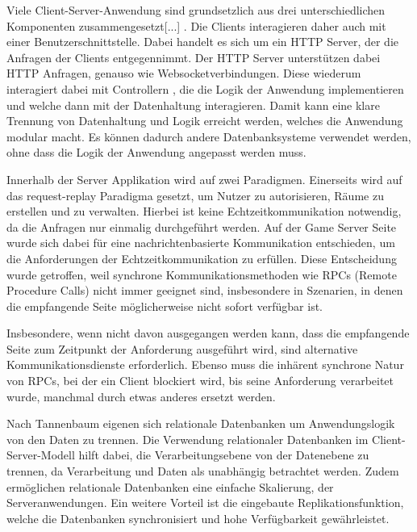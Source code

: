 \documentclass[
]{article}
\begin{document}
\glqq Viele Client-Server-Anwendung sind grundsetzlich aus drei unterschiedlichen Komponenten zusammengesetzt[...]\grqq{} \cite[S.57 ff.]{tanenbaum2007distributed}.
Die Clients interagieren daher auch mit einer Benutzerschnittstelle. Dabei handelt es sich um ein HTTP Server, der die Anfragen der Clients entgegennimmt.
Der HTTP Server unterstützen dabei HTTP Anfragen, genauso wie Websocketverbindungen.
Diese wiederum interagiert dabei mit \glqq Controllern \grqq{}, die die Logik der Anwendung implementieren und welche dann
mit der Datenhaltung interagieren. Damit kann eine klare Trennung von Datenhaltung und Logik erreicht werden, welches die Anwendung
modular macht. Es können dadurch andere Datenbanksysteme verwendet werden, ohne dass die Logik der Anwendung angepasst werden muss.

Innerhalb der Server Applikation wird auf zwei Paradigmen.
Einerseits wird auf das request-replay Paradigma gesetzt, um Nutzer zu autorisieren, Räume zu erstellen und zu verwalten.
Hierbei ist keine Echtzeitkommunikation notwendig, da die Anfragen nur einmalig durchgeführt werden.
Auf der Game Server Seite wurde sich dabei für eine nachrichtenbasierte Kommunikation entschieden, 
um die Anforderungen der Echtzeitkommunikation zu erfüllen. Diese Entscheidung wurde getroffen, 
weil synchrone Kommunikationsmethoden wie RPCs (Remote Procedure Calls) nicht immer geeignet 
sind, insbesondere in Szenarien, in denen die empfangende Seite möglicherweise nicht sofort 
verfügbar ist. 

\glqq Insbesondere, wenn nicht davon ausgegangen werden kann, 
dass die empfangende Seite zum Zeitpunkt der Anforderung ausgeführt wird, 
sind alternative Kommunikationsdienste erforderlich. 
Ebenso muss die inhärent synchrone Natur von RPCs, 
bei der ein Client blockiert wird, bis seine Anforderung verarbeitet wurde, 
manchmal durch etwas anderes ersetzt werden.\grqq{} \cite[S. 140 ff.]{tanenbaum2007distributed}



Nach Tannenbaum eigenen sich relationale Datenbanken um Anwendungslogik von den Daten zu trennen.
\glqq Die Verwendung relationaler Datenbanken im Client-Server-Modell hilft dabei, 
die Verarbeitungsebene von der Datenebene zu trennen, da Verarbeitung und Daten als unabhängig betrachtet werden.\grqq{} \cite[S. 40 ff.]{tanenbaum2007distributed}
Zudem ermöglichen relationale Datenbanken eine einfache Skalierung, der Serveranwendungen.
Ein weitere Vorteil ist die eingebaute Replikationsfunktion, welche die Datenbanken synchronisiert und hohe Verfügbarkeit gewährleistet.\cite[Chapter 27]{postgresql-high-availability}
\end{document}
